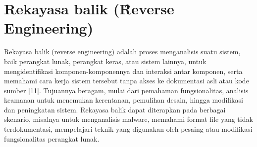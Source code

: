 \section{Rekayasa balik (\f{Reverse Engineering})}
Rekayasa balik (reverse engineering) adalah proses menganalisis suatu sistem, baik perangkat lunak, perangkat keras, atau sistem lainnya, untuk mengidentifikasi komponen-komponennya dan interaksi antar komponen, serta memahami cara kerja sistem tersebut tanpa akses ke dokumentasi asli atau kode sumber [11]. Tujuannya beragam, mulai dari pemahaman fungsionalitas, analisis keamanan untuk menemukan kerentanan, pemulihan desain, hingga modifikasi dan peningkatan sistem. Rekayasa balik dapat diterapkan pada berbagai skenario, misalnya untuk menganalisis malware, memahami format file yang tidak terdokumentasi, mempelajari teknik yang digunakan oleh pesaing atau modifikasi fungsionalitas perangkat lunak.


